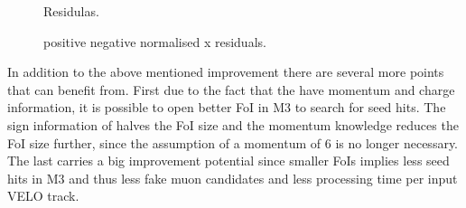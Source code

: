 \begin{figure}[h]
  \centering
  \begin{subfigure}{0.5\textwidth}
    \scalebox{.6}{}
    \caption{}
    \label{mvTTm_res_x}
  \end{subfigure}%
  \hfill%
  \begin{subfigure}{0.5\textwidth}
    \scalebox{.6}{}
    \caption{}
    \label{mvm_res_y}
  \end{subfigure}
  \caption{Residulas.  }
 \label{mvm_res}
\end{figure}

\begin{figure}[h]
  \centering
  \begin{subfigure}{0.5\textwidth}
    \scalebox{.6}{}
    \caption{}
    \label{mvTTm_pos_neg_x_norm}
  \end{subfigure}%
  \hfill%
  \begin{subfigure}{0.5\textwidth}
    \scalebox{.6}{}
    \caption{}
    \label{mvm_pos_neg_x_norm}
  \end{subfigure}
  \caption{positive negative normalised x residuals. }
 \label{mvm_pos_neg_x_norm_comp}
\end{figure}



In addition to the above mentioned improvement there are several more points that \mvm can benefit from.
First due to the fact that the \veloTTCand have momentum and charge information, it is possible to open better
FoI in M3 to search for seed hits. The sign information of \veloTTCand halves the FoI size
and the momentum knowledge reduces the FoI size further, since the assumption of a momentum of 6 \mev
is no longer necessary. The last carries a big improvement potential
since smaller FoIs implies less seed hits in M3 and thus less fake muon candidates and less processing time per input VELO track.

